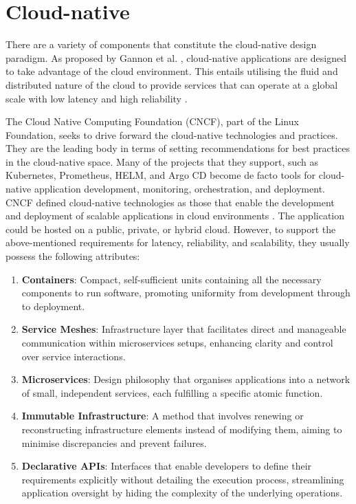 \section{Cloud-native}
There are a variety of components that constitute the cloud-native design paradigm. As proposed by Gannon et al. \cite{gannonCloudNativeApplications2017}, cloud-native applications are designed to take advantage of the cloud environment. This entails utilising the fluid and distributed nature of the cloud to provide services that can operate at a global scale with low latency and high reliability \cite{gannonCloudNativeApplications2017}.

The Cloud Native Computing Foundation (CNCF), part of the Linux Foundation, seeks to drive forward the cloud-native technologies and practices. They are the leading body in terms of setting recommendations for best practices in the cloud-native space. Many of the projects that they support, such as Kubernetes, Prometheus, HELM, and Argo CD become de facto tools for cloud-native application development, monitoring, orchestration, and deployment. CNCF defined cloud-native technologies as those that enable the development and deployment of scalable applications in cloud environments \cite{cloudnativecomputingfoundationWhoWeAre}. The application could be hosted on a public, private, or hybrid cloud. However, to support the above-mentioned requirements for latency, reliability, and scalability, they usually possess the following attributes:

\begin{enumerate}
\item
  \textbf{Containers}: Compact, self-sufficient units containing all the necessary components to run software, promoting uniformity from development through to deployment.
\item
  \textbf{Service Meshes}: Infrastructure layer that facilitates direct and manageable communication within microservices setups, enhancing clarity and control over service interactions.
\item
  \textbf{Microservices}: Design philosophy that organises applications into a network of small, independent services, each fulfilling a specific atomic function.
\item
  \textbf{Immutable Infrastructure}: A method that involves renewing or reconstructing infrastructure elements instead of modifying them, aiming to minimise discrepancies and prevent failures.
\item
  \textbf{Declarative APIs}: Interfaces that enable developers to define their requirements explicitly without detailing the execution process, streamlining application oversight by hiding the complexity of the underlying operations.
\end{enumerate}

